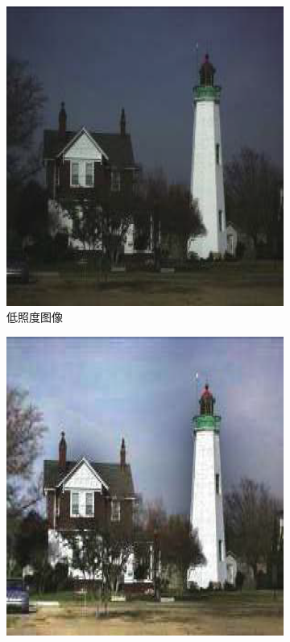 \documentclass[a4paper]{ctexart}
\begin{document}
	\begin{figure}[htb] 
		\centering 
		\begin{subfigure}{0.18\textwidth}
			\includegraphics[width=\linewidth]{picture/LLIE/Retinex Model/input}
			\captionsetup{font=scriptsize}
			\caption{低照度图像}
			\label{fig: Retinex Model_input}
		\end{subfigure}
		\begin{subfigure}{0.18\textwidth}
			\includegraphics[width=\linewidth]{picture/LLIE/Retinex Model/Retinex}

\end{subfigure}
\end{figure}
\end{document}
